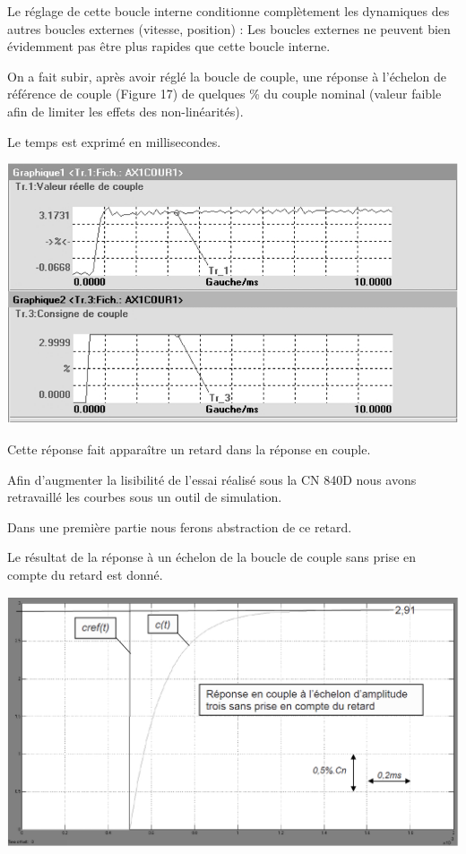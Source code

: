 Le réglage de cette boucle interne conditionne complètement les dynamiques des autres boucles externes (vitesse, position) : Les boucles externes ne peuvent bien évidemment pas être plus rapides que cette boucle interne.




On a fait subir, après avoir réglé la boucle de couple, une réponse à l'échelon de référence de couple (Figure 17) de quelques \% du couple nominal (valeur faible afin de limiter les effets des non-linéarités).

Le temps est exprimé en millisecondes.

\begin{center}
 \includegraphics[width=0.7\linewidth]{img/img19}
\end{center}

Cette réponse fait apparaître un retard dans la réponse en couple.

Afin d'augmenter la lisibilité de l'essai réalisé sous la CN 840D nous avons retravaillé les courbes sous un outil de simulation.

Dans une première partie nous ferons abstraction de ce retard.

Le résultat de la réponse à un échelon de la boucle de couple sans prise en compte du retard est donné.

\begin{center}
 \includegraphics[width=0.8\linewidth]{img/img20}
\end{center}

